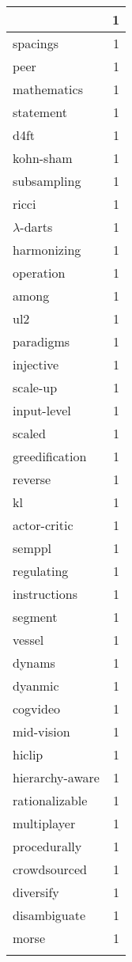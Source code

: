 \begin{table}[h]
\begin{tabular}{|l|r|}
{\hline
dilated & 1 \\
\hline
spacings & 1 \\
\hline
peer & 1 \\
\hline
mathematics & 1 \\
\hline
statement & 1 \\
\hline
d4ft & 1 \\
\hline
kohn-sham & 1 \\
\hline
subsampling & 1 \\
\hline
ricci & 1 \\
\hline
$\lambda$-darts & 1 \\
\hline
harmonizing & 1 \\
\hline
operation & 1 \\
\hline
among & 1 \\
\hline
ul2 & 1 \\
\hline
paradigms & 1 \\
\hline
injective & 1 \\
\hline
scale-up & 1 \\
\hline
input-level & 1 \\
\hline
scaled & 1 \\
\hline
greedification & 1 \\
\hline
reverse & 1 \\
\hline
kl & 1 \\
\hline
actor-critic & 1 \\
\hline
semppl & 1 \\
\hline
regulating & 1 \\
\hline
instructions & 1 \\
\hline
segment & 1 \\
\hline
vessel & 1 \\
\hline
dynams & 1 \\
\hline
dyanmic & 1 \\
\hline
cogvideo & 1 \\
\hline
mid-vision & 1 \\
\hline
hiclip & 1 \\
\hline
hierarchy-aware & 1 \\
\hline
rationalizable & 1 \\
\hline
multiplayer & 1 \\
\hline
procedurally & 1 \\
\hline
crowdsourced & 1 \\
\hline
diversify & 1 \\
\hline
disambiguate & 1 \\
\hline
morse & 1 \\
}
\end{tabular}
\end{table}
